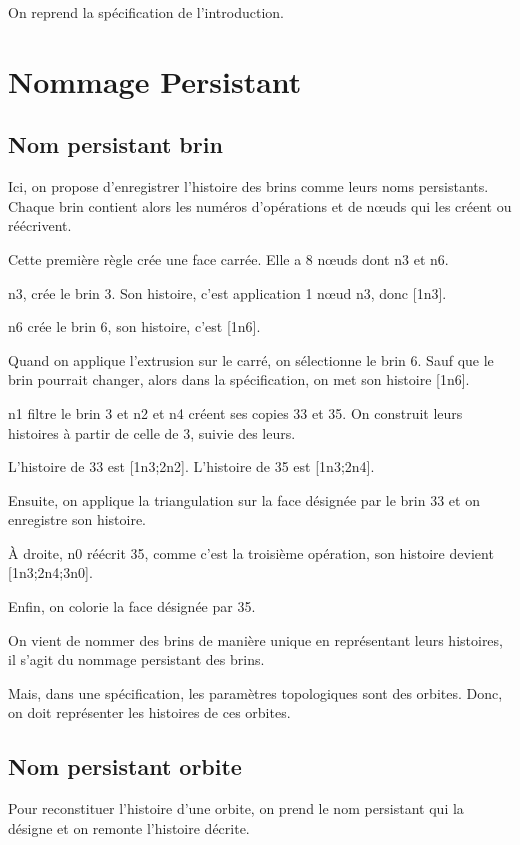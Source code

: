 \documentclass[11pt]{article}
\begin{document}
On reprend la spécification de l'introduction.
\section{Nommage Persistant}
\label{sec:org84648da}

\subsection{Nom persistant brin}
\label{sec:org53f1b92}

Ici, on propose d'enregistrer l'histoire des brins comme leurs noms
persistants. %
Chaque brin contient alors les numéros d'opérations et de nœuds qui les créent
ou réécrivent.

Cette première règle crée une face carrée.
Elle a 8 nœuds dont n3 et n6.

n3, crée le brin 3. Son histoire, c'est application 1 nœud n3, donc [1n3].

n6 crée le brin 6, son histoire, c'est [1n6].

Quand on applique l'extrusion sur le carré, on sélectionne le brin 6. %
Sauf que le brin pourrait changer, alors dans la spécification, on met son histoire [1n6].

n1 filtre le brin 3 et n2 et n4 créent ses copies 33 et 35. %
On construit leurs histoires à partir de celle de 3, suivie des leurs.

L'histoire de 33 est [1n3;2n2]. %
L'histoire de 35 est [1n3;2n4].

Ensuite, on applique la triangulation sur la face désignée par le brin 33 et on
enregistre son histoire.

À droite, n0 réécrit 35, comme c'est la troisième opération, son histoire devient
[1n3;2n4;3n0].

Enfin, on colorie la face désignée par 35.

On vient de nommer des brins de manière unique en représentant leurs histoires, il s'agit du nommage persistant des brins.

Mais, dans une spécification, les paramètres topologiques sont des orbites.
Donc, on doit représenter les histoires de ces orbites.

\subsection{Nom persistant orbite}
\label{sec:orgf5219a2}

Pour reconstituer l'histoire d'une orbite, on prend le nom persistant qui la
désigne et on remonte l'histoire décrite.
\end{document}
